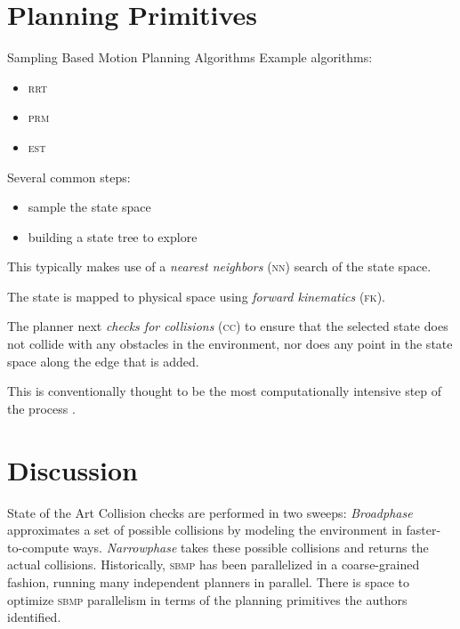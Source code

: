 \documentclass{beamer}
\newcommand{\todo}[1]{\textit{\textcolor{red}{#1}}}
\begin{document}
\section{Planning Primitives}

\begin{frame}[allowframebreaks]{Sampling Based Motion Planning Algorithms}
Example algorithms:
\begin{itemize}\item \textsc{rrt} \item \textsc{prm} \item \textsc{est} \end{itemize}

Several common steps:\begin{itemize}\item sample the state space \item building a state tree to explore \end{itemize} 

This typically makes use of a \textit{nearest neighbors} (\textsc{nn}) search of the state space.

The state is mapped to physical space using \textit{forward kinematics} (\textsc{fk}). 

The planner next \textit{checks for collisions} (\textsc{cc}) to ensure that the selected state does not collide with any obstacles in the environment, nor does any point in the state space along the edge that is added. 

This is conventionally thought to be the most computationally intensive step of the process \cite{paper:MiM}. 
\end{frame}


\section{Discussion}
\begin{frame}[allowframebreaks]{State of the Art}
Collision checks are performed in two sweeps: \textit{Broadphase} approximates a set of possible collisions by modeling the environment in faster-to-compute ways. \textit{Narrowphase} takes these possible collisions and returns the actual collisions.
Historically, \textsc{sbmp} has been parallelized in a coarse-grained fashion, running many independent planners in parallel. There is space to optimize \textsc{sbmp} parallelism in terms of the planning primitives the authors identified. 
\end{frame}
\end{document}
